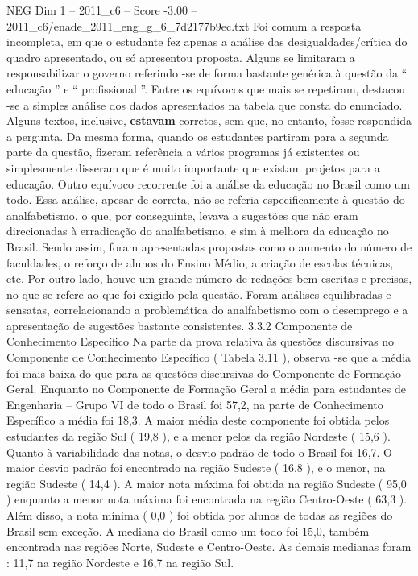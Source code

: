 \begin{textsample}{NEG Dim 1 – 2011\_c6 – Score -3.00 – 2011\_c6/enade\_2011\_eng\_g\_6\_7d2177b9ec.txt}
Foi comum a resposta incompleta, em que o estudante fez apenas a análise das desigualdades/crítica do quadro apresentado, ou só apresentou proposta.
Alguns se limitaram a responsabilizar o governo referindo -se de forma bastante genérica à questão da “ educação ” e “ profissional ”.
Entre os equívocos que mais se repetiram, destacou -se a simples análise dos dados apresentados na tabela que consta do enunciado.
Alguns textos, inclusive, \textbf{estavam} corretos, sem que, no entanto, fosse respondida a pergunta.
Da mesma forma, quando os estudantes partiram para a segunda parte da questão, fizeram referência a vários programas já existentes ou simplesmente disseram que é muito importante que existam projetos para a educação.
Outro equívoco recorrente foi a análise da educação no Brasil como um todo.
Essa análise, apesar de correta, não se referia especificamente à questão do analfabetismo, o que, por conseguinte, levava a sugestões que não eram direcionadas à erradicação do analfabetismo, e sim à melhora da educação no Brasil.
Sendo assim, foram apresentadas propostas como o aumento do número de faculdades, o reforço de alunos do Ensino Médio, a criação de escolas técnicas, etc.
Por outro lado, houve um grande número de redações bem escritas e precisas, no que se refere ao que foi exigido pela questão.
Foram análises equilibradas e sensatas, correlacionando a problemática do analfabetismo com o desemprego e a apresentação de sugestões bastante consistentes. 3.3.2 Componente de Conhecimento Específico Na parte da prova relativa às questões discursivas no Componente de Conhecimento Específico ( Tabela 3.11 ), observa -se que a média foi mais baixa do que para as questões discursivas do Componente de Formação Geral.
Enquanto no Componente de Formação Geral a média para estudantes de Engenharia – Grupo VI de todo o Brasil foi 57,2, na parte de Conhecimento Específico a média foi 18,3.
A maior média deste componente foi obtida pelos estudantes da região Sul ( 19,8 ), e a menor pelos da região Nordeste ( 15,6 ).
Quanto à variabilidade das notas, o desvio padrão de todo o Brasil foi 16,7.
O maior desvio padrão foi encontrado na região Sudeste ( 16,8 ), e o menor, na região Sudeste ( 14,4 ).
A maior nota máxima foi obtida na região Sudeste ( 95,0 ) enquanto a menor nota máxima foi encontrada na região Centro-Oeste ( 63,3 ).
Além disso, a nota mínima ( 0,0 ) foi obtida por alunos de todas as regiões do Brasil sem exceção.
A mediana do Brasil como um todo foi 15,0, também encontrada nas regiões Norte, Sudeste e Centro-Oeste.
As demais medianas foram : 11,7 na região Nordeste e 16,7 na região Sul.

\end{textsample}
